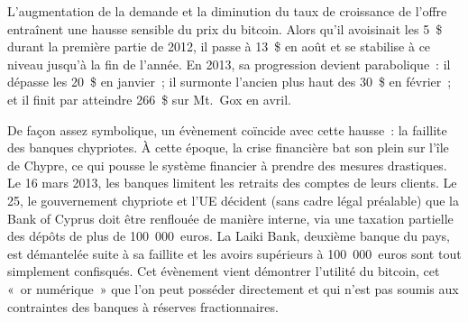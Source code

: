 L'augmentation de la demande et la diminution du taux de croissance de l'offre entraînent une hausse sensible du prix du bitcoin. Alors qu'il avoisinait les 5~\$ durant la première partie de 2012, il passe à 13~\$ en août et se stabilise à ce niveau jusqu'à la fin de l'année. En 2013, sa progression devient parabolique~: il dépasse les 20~\$ en janvier~; il surmonte l'ancien plus haut des 30~\$ en février~; et il finit par atteindre 266~\$ sur Mt.~Gox en avril.

De façon assez symbolique, un évènement coïncide avec cette hausse~: la faillite des banques chypriotes. À cette époque, la crise financière bat son plein sur l'île de Chypre, ce qui pousse le système financier à prendre des mesures drastiques. Le 16 mars 2013, les banques limitent les retraits des comptes de leurs clients. Le 25, le gouvernement chypriote et l'UE décident (sans cadre légal préalable) que la Bank of Cyprus doit être renflouée de manière interne, via une taxation partielle des dépôts de plus de 100~000~euros. La Laiki Bank, deuxième banque du pays, est démantelée suite à sa faillite et les avoirs supérieurs à 100~000~euros sont tout simplement confisqués. Cet évènement vient démontrer l'utilité du bitcoin, cet «~or numérique~» que l'on peut posséder directement et qui n'est pas soumis aux contraintes des banques à réserves fractionnaires. %

